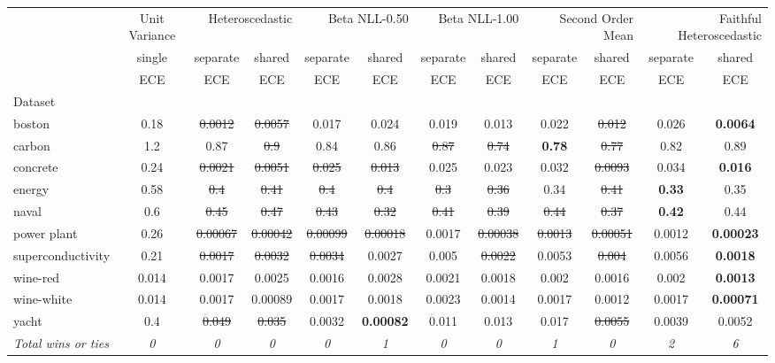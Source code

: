 \begin{tabular}{l|c|cc|cc|cc|cc|cc}
\toprule
{} & {Unit Variance} & \multicolumn{2}{r}{Heteroscedastic} & \multicolumn{2}{r}{Beta NLL-0.50} & \multicolumn{2}{r}{Beta NLL-1.00} & \multicolumn{2}{r}{Second Order Mean} & \multicolumn{2}{r}{Faithful Heteroscedastic} \\
{} & {single} & {separate} & {shared} & {separate} & {shared} & {separate} & {shared} & {separate} & {shared} & {separate} & {shared} \\
{} & {ECE} & {ECE} & {ECE} & {ECE} & {ECE} & {ECE} & {ECE} & {ECE} & {ECE} & {ECE} & {ECE} \\
{Dataset} & {} & {} & {} & {} & {} & {} & {} & {} & {} & {} & {} \\
\midrule
boston & 0.18 & \sout{0.0012} & \sout{0.0057} & 0.017 & 0.024 & 0.019 & 0.013 & 0.022 & \sout{0.012} & 0.026 & \textbf{0.0064} \\
carbon & 1.2 & 0.87 & \sout{0.9} & 0.84 & 0.86 & \sout{0.87} & \sout{0.74} & \textbf{0.78} & \sout{0.77} & 0.82 & 0.89 \\
concrete & 0.24 & \sout{0.0021} & \sout{0.0051} & \sout{0.025} & \sout{0.013} & 0.025 & 0.023 & 0.032 & \sout{0.0093} & 0.034 & \textbf{0.016} \\
energy & 0.58 & \sout{0.4} & \sout{0.41} & \sout{0.4} & \sout{0.4} & \sout{0.3} & \sout{0.36} & 0.34 & \sout{0.41} & \textbf{0.33} & 0.35 \\
naval & 0.6 & \sout{0.45} & \sout{0.47} & \sout{0.43} & \sout{0.32} & \sout{0.41} & \sout{0.39} & \sout{0.44} & \sout{0.37} & \textbf{0.42} & 0.44 \\
power plant & 0.26 & \sout{0.00067} & \sout{0.00042} & \sout{0.00099} & \sout{0.00018} & 0.0017 & \sout{0.00038} & \sout{0.0013} & \sout{0.00051} & 0.0012 & \textbf{0.00023} \\
superconductivity & 0.21 & \sout{0.0017} & \sout{0.0032} & \sout{0.0034} & 0.0027 & 0.005 & \sout{0.0022} & 0.0053 & \sout{0.004} & 0.0056 & \textbf{0.0018} \\
wine-red & 0.014 & 0.0017 & 0.0025 & 0.0016 & 0.0028 & 0.0021 & 0.0018 & 0.002 & 0.0016 & 0.002 & \textbf{0.0013} \\
wine-white & 0.014 & 0.0017 & 0.00089 & 0.0017 & 0.0018 & 0.0023 & 0.0014 & 0.0017 & 0.0012 & 0.0017 & \textbf{0.00071} \\
yacht & 0.4 & \sout{0.049} & \sout{0.035} & 0.0032 & \textbf{0.00082} & 0.011 & 0.013 & 0.017 & \sout{0.0055} & 0.0039 & 0.0052 \\
\textit{{Total wins or ties}} & \textit{0} & \textit{0} & \textit{0} & \textit{0} & \textit{1} & \textit{0} & \textit{0} & \textit{1} & \textit{0} & \textit{2} & \textit{6} \\
\bottomrule
\end{tabular}
